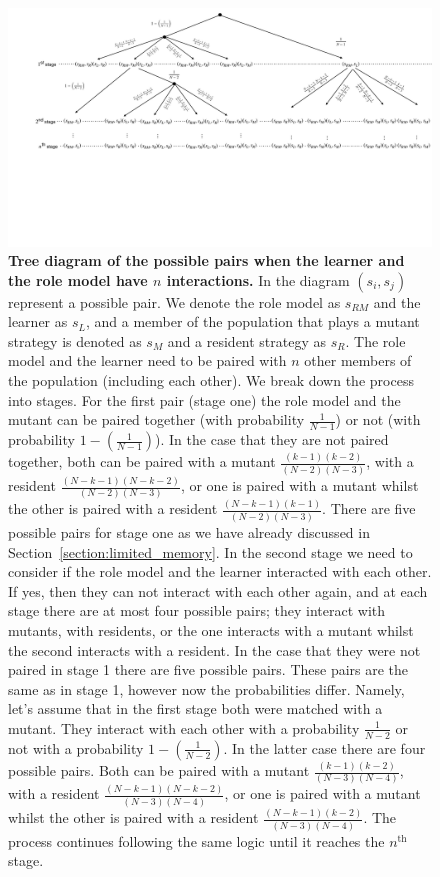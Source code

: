 \documentclass[11pt]{article}
\theoremstyle{plainCl1}
\theoremstyle{plainCl2}
\begin{document}
\begin{figure}[!htbp]
  \centering 
  \includegraphics[width=\textwidth]{static/matching_tree.pdf}
  \caption{\textbf{Tree diagram of the possible pairs when the learner and the role
  model have $n$ interactions.} In the diagram \((s_i, s_j)\) represent a possible
  pair. We denote the role model as $s_{RM}$ and the learner as $s_{L}$, and
  a member of the population that plays a mutant strategy is denoted as $s_{M}$ and
  a resident strategy as $s_{R}$. The role model and
  the learner need to be paired with $n$ other members of the population
  (including each other). We break down the process into stages. For the first
  pair (stage one) the role model and the mutant can be paired together (with
  probability $\frac{1}{N-1}$) or not (with probability $1 -
  \left(\frac{1}{N-1}\right)$). In the case that they are not paired together,
  both can be paired with a mutant $\frac{(k-1)(k-2)}{(N-2)(N-3)}$, with a
  resident $\frac{(N-k-1)(N-k-2)}{(N-2)(N-3)}$, or one is paired with a mutant
  whilst the other is paired with a resident $\frac{(N-k-1)(k-1)}{(N-2)(N-3)}$.
  There are five possible pairs for stage one as we have already discussed
  in Section~\ref{section:limited_memory}. In
  the second stage we need to consider if the role model and the learner
  interacted with each other. If yes, then they can not interact with each other
  again, and at each stage there are at most four possible pairs; they interact with
  mutants, with residents, or the one interacts with a mutant whilst the second
  interacts with a resident. In the case that they were not paired in stage 1
  there are five possible pairs. These pairs are the same as in stage 1,
  however now the probabilities differ. Namely, let's assume that in the
  first stage both were matched with a mutant. They interact with each
  other with a probability $\frac{1}{N-2}$ or not with a probability
  $1 - \left(\frac{1}{N-2}\right)$. In the latter case there are four
  possible pairs.
  Both can be paired with a mutant $\frac{(k-1)(k-2)}{(N-3)(N-4)}$, with a
  resident $\frac{(N-k-1)(N-k-2)}{(N-3)(N-4)}$, or one is paired with a mutant
  whilst the other is paired with a resident $\frac{(N-k-1)(k-2)}{(N-3)(N-4)}$.
  The process continues following the same logic until it reaches the $n^{\text{th}}$
  stage.}\label{fig:matching_tree}
\end{figure}
\end{document}

